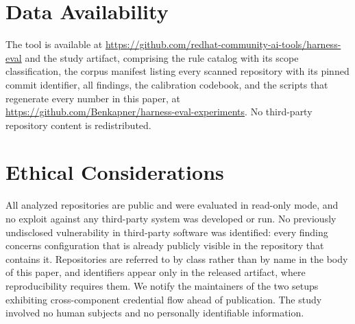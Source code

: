\documentclass[conference]{IEEEtran}
\begin{document}
\section*{Data Availability}

The tool is available at \url{https://github.com/redhat-community-ai-tools/harness-eval}
and the study artifact, comprising the rule catalog with its scope
classification, the corpus manifest listing every scanned repository with its
pinned commit identifier, all findings, the calibration codebook, and the
scripts that regenerate every number in this paper, at
\url{https://github.com/Benkapner/harness-eval-experiments}. No third-party
repository content is redistributed.

\section*{Ethical Considerations}

All analyzed repositories are public and were evaluated in read-only mode, and
no exploit against any third-party system was developed or run. No previously
undisclosed vulnerability in third-party software was identified: every finding
concerns configuration that is already publicly visible in the repository that
contains it. Repositories are referred to by class rather than by name in the
body of this paper, and identifiers appear only in the released artifact, where
reproducibility requires them. We notify the maintainers of the two setups
exhibiting cross-component credential flow ahead of publication. The study
involved no human subjects and no personally identifiable information.
\end{document}
